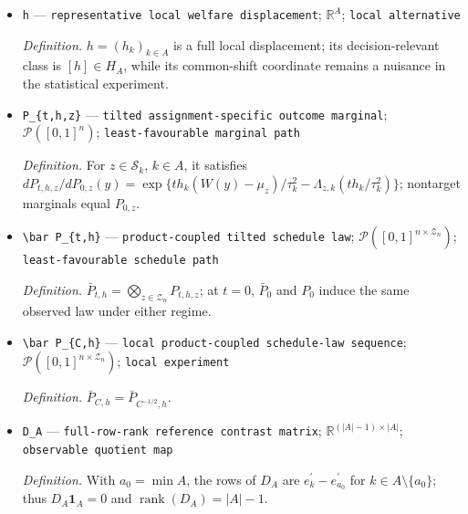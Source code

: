 \documentclass{article}
\begin{document}
\begin{itemize}
  \par\smallskip\noindent\emph{Definition.} \(H_A=\mathbb R^A/\operatorname{span}\{\mathbf 1_A\}\); a zero-sum vector is only one representative and is not itself observed.
  \item \texttt{h} --- \texttt{representative local welfare displacement}; \(\mathbb R^A\); \texttt{local alternative}
  \par\smallskip\noindent\emph{Definition.} \(h=(h_k)_{k\in A}\) is a full local displacement; its decision-relevant class is \([h]\in H_A\), while its common-shift coordinate remains a nuisance in the statistical experiment.
  \item \texttt{P\_\allowbreak{}\{t,\allowbreak{}h,\allowbreak{}z\}\allowbreak{}} --- \texttt{tilted assignment-\allowbreak{}specific outcome marginal}; \(\mathcal P([0,1]^n)\); \texttt{least-\allowbreak{}favourable marginal path}
  \par\smallskip\noindent\emph{Definition.} For \(z\in\mathcal S_k\), \(k\in A\), it satisfies \(dP_{t,h,z}/dP_{0,z}(y)=\exp\{t h_k(W(y)-\mu_z)/\tau_k^2-\Lambda_{z,k}(t h_k/\tau_k^2)\}\); nontarget marginals equal \(P_{0,z}\).
  \item \texttt{\textbackslash{}\allowbreak{}bar P\_\allowbreak{}\{t,\allowbreak{}h\}\allowbreak{}} --- \texttt{product-\allowbreak{}coupled tilted schedule law}; \(\mathcal P([0,1]^{n\times\mathcal Z_n})\); \texttt{least-\allowbreak{}favourable schedule path}
  \par\smallskip\noindent\emph{Definition.} \(\bar P_{t,h}=\bigotimes_{z\in\mathcal Z_n}P_{t,h,z}\); at \(t=0\), \(\bar P_0\) and \(P_0\) induce the same observed law under either regime.
  \item \texttt{\textbackslash{}\allowbreak{}bar P\_\allowbreak{}\{C,\allowbreak{}h\}\allowbreak{}} --- \texttt{local product-\allowbreak{}coupled schedule-\allowbreak{}law sequence}; \(\mathcal P([0,1]^{n\times\mathcal Z_n})\); \texttt{local experiment}
  \par\smallskip\noindent\emph{Definition.} \(\bar P_{C,h}=\bar P_{C^{-1/2},h}\).
  \item \texttt{D\_\allowbreak{}A} --- \texttt{full-\allowbreak{}row-\allowbreak{}rank reference contrast matrix}; \(\mathbb R^{(|A|-1)\times |A|}\); \texttt{observable quotient map}
  \par\smallskip\noindent\emph{Definition.} With \(a_0=\min A\), the rows of \(D_A\) are \(e_k^{\prime}-e_{a_0}^{\prime}\) for \(k\in A\setminus\{a_0\}\); thus \(D_A\mathbf 1_A=0\) and \(\operatorname{rank}(D_A)=|A|-1\).

\end{itemize}
\end{document}
